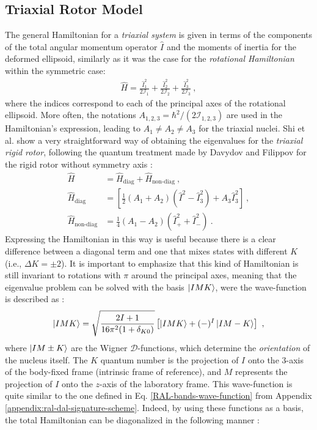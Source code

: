\subsection{Triaxial Rotor Model}
\label{trm-model}

The general Hamiltonian for a \emph{triaxial system} is given in terms of the components of the total angular momentum operator $\hat{I}$ and the moments of inertia for the deformed ellipsoid, similarly as it was the case for the \emph{rotational Hamiltonian} within the symmetric case:
\begin{align}
    \hat{H}=\frac{\hat{I}_1^2}{2\mathcal{I}_1}+\frac{\hat{I}_2^2}{2\mathcal{I}_2}+\frac{\hat{I}_3^2}{2\mathcal{I}_3}\ ,
    \label{general-rotor-hamiltonian}
\end{align}
where the indices correspond to each of the principal axes of the rotational ellipsoid.
More often, the notations $A_{1,2,3}=\hbar^2/\left(2\mathcal{I}_{1,2,3}\right)$ are used in the Hamiltonian's expression, leading to $A_1\neq A_2\neq A_3$ for the triaxial nuclei. Shi et al. \cite{wen2015wobbling} show a very straightforward way of obtaining the eigenvalues for the \emph{triaxial rigid rotor}, following the quantum treatment made by Davydov and Filippov for the rigid rotor without symmetry axis \cite{davydov1958rotational}:
\begin{align}
    \hat{H}&=\hat{H}_\text{diag}+\hat{H}_\text{non-diag}\ ,\nonumber\\
    \hat{H}_\text{diag}&=\left[\frac{1}{2}\left(A_1+A_2\right)\left(\hat{I}^2-\hat{I}_3^2\right)+A_3\hat{I}_3^2\right]\ ,\nonumber\\
    \hat{H}_\text{non-diag}&=\frac{1}{4}\left(A_1-A_2\right)\left(\hat{I}_+^2+\hat{I}_-^2\right)\ .
\end{align}
Expressing the Hamiltonian in this way is useful because there is a clear difference between a diagonal term and one that mixes states with different $K$ (i.e., $\Delta K=\pm2$). It is important to emphasize that this kind of Hamiltonian is still invariant to rotations with $\pi$ around the principal axes, meaning that the eigenvalue problem can be solved with the basis $\ket{IMK}$, were the wave-function is described as \cite{wen2015wobbling}:
\begin{align}
    \ket{IMK}=\sqrt{\frac{2I+1}{16\pi^2(1+\delta_{K0})}}\left[\ket{IMK}+(-)^I\ket{IM-K}\right]\ ,
\end{align}
where $\ket{IM\pm K}$ are the Wigner $\mathcal{D}$-functions, which determine the \emph{orientation} of the nucleus itself. The $K$ quantum number is the projection of $I$ onto the 3-axis of the body-fixed frame (intrinsic frame of reference), and $M$ represents the projection of $I$ onto the $z$-axis of the laboratory frame. This wave-function is quite similar to the one defined in Eq. \eqref{RAL-bands-wave-function} from Appendix \ref{appendix:ral-dal-signature-scheme}. Indeed, by using these functions as a basis, the total Hamiltonian can be diagonalized in the following manner \cite{wen2015wobbling}:
